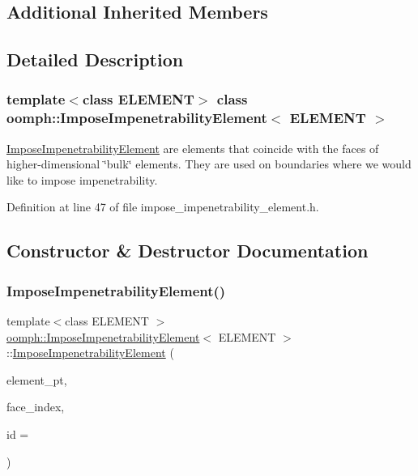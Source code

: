 \subsection*{Additional Inherited Members}


\subsection{Detailed Description}
\subsubsection*{template$<$class E\+L\+E\+M\+E\+NT$>$\newline
class oomph\+::\+Impose\+Impenetrability\+Element$<$ E\+L\+E\+M\+E\+N\+T $>$}

\hyperlink{classoomph_1_1ImposeImpenetrabilityElement}{Impose\+Impenetrability\+Element} are elements that coincide with the faces of higher-\/dimensional \char`\"{}bulk\char`\"{} elements. They are used on boundaries where we would like to impose impenetrability. 

Definition at line 47 of file impose\+\_\+impenetrability\+\_\+element.\+h.



\subsection{Constructor \& Destructor Documentation}
\mbox{\label{classoomph_1_1ImposeImpenetrabilityElement_ae00b64597005a63ba62f7db13784a5fd}} 
\subsubsection{\texorpdfstring{Impose\+Impenetrability\+Element()}{ImposeImpenetrabilityElement()}}
{\footnotesize\ttfamily template$<$class E\+L\+E\+M\+E\+NT $>$ \\
\hyperlink{classoomph_1_1ImposeImpenetrabilityElement}{oomph\+::\+Impose\+Impenetrability\+Element}$<$ E\+L\+E\+M\+E\+NT $>$\+::\hyperlink{classoomph_1_1ImposeImpenetrabilityElement}{Impose\+Impenetrability\+Element} (\begin{DoxyParamCaption}\item[{\hyperlink{classoomph_1_1FiniteElement}{Finite\+Element} $\ast$const \&}]{element\+\_\+pt,  }\item[{const int \&}]{face\+\_\+index,  }\item[{const unsigned \&}]{id = {} }\end{DoxyParamCaption})\hspace{0.3cm}{\ttfamily [inline]}}



